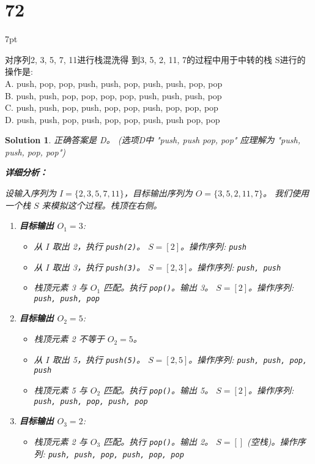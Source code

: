 \documentclass[UTF8]{report}
\newtheorem{solution}{Solution}
\theoremstyle{MyLineTheoremStyle} %
\theoremstyle{MyBlockTheoremStyle} %
\theoremstyle{MySubsubsectionStyle} %
\newenvironment{graybox}{%
        \def\FrameCommand{%
        \hspace{1pt}%
        {\color{gray}\small \vrule width 2pt}%
        {\color{graybox_color}\vrule width 4pt}%
        \colorbox{graybox_color}%
        }%
        \MakeFramed{\advance\hsize-\width\FrameRestore}%
        \noindent\hspace{-4.55pt}%
        \begin{adjustwidth}{}{7pt}%
        \vspace{2pt}\vspace{2pt}%
        }
        {%
        \vspace{2pt}\end{adjustwidth}\endMakeFramed%
        }
\begin{document}
\section*{72}
\begin{graybox}
对序列{2, 3, 5, 7, 11}进行栈混洗得
到{3, 5, 2, 11, 7}的过程中用于中转的栈
S进行的操作是:\\
A. push, pop, pop, push, push, pop, push, push, pop, pop \\
B. push, push, pop, pop, pop, pop, push, push, push, pop \\
C. push, push, pop, push, pop, pop, push, pop, pop, pop \\
D. push, push, pop, push, pop, pop, push, push pop, pop
\end{graybox}

\begin{solution}
正确答案是 D。
(选项D中 "push, push pop, pop" 应理解为 "push, push, pop, pop")

\textbf{详细分析：}

设输入序列为 $I = \{2, 3, 5, 7, 11\}$，目标输出序列为 $O = \{3, 5, 2, 11, 7\}$。
我们使用一个栈 $S$ 来模拟这个过程。栈顶在右侧。

\begin{enumerate}
    \item \textbf{目标输出 $O_1 = 3$}:
    \begin{itemize}
        \item 从 $I$ 取出 2，执行 \texttt{push(2)}。 $S = [2]$。操作序列: \texttt{push}
        \item 从 $I$ 取出 3，执行 \texttt{push(3)}。 $S = [2, 3]$。操作序列: \texttt{push, push}
        \item 栈顶元素 3 与 $O_1$ 匹配。执行 \texttt{pop()}。输出 3。 $S = [2]$。操作序列: \texttt{push, push, pop}
    \end{itemize}

    \item \textbf{目标输出 $O_2 = 5$}:
    \begin{itemize}
        \item 栈顶元素 2 不等于 $O_2=5$。
        \item 从 $I$ 取出 5，执行 \texttt{push(5)}。 $S = [2, 5]$。操作序列: \texttt{push, push, pop, push}
        \item 栈顶元素 5 与 $O_2$ 匹配。执行 \texttt{pop()}。输出 5。 $S = [2]$。操作序列: \texttt{push, push, pop, push, pop}
    \end{itemize}

    \item \textbf{目标输出 $O_3 = 2$}:
    \begin{itemize}
        \item 栈顶元素 2 与 $O_3$ 匹配。执行 \texttt{pop()}。输出 2。 $S = []$ (空栈)。操作序列: \texttt{push, push, pop, push, pop, pop}
    \end{itemize}


\end{enumerate}
\end{solution}
\end{document}
